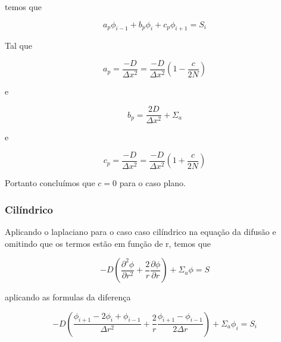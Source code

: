 \documentclass{article}
\begin{document}
                temos que
                
                \begin{equation}
                    a_p \phi_{i-1}    +    b_p \phi_i    +    c_p \phi_{i+1} = S_i
                \end{equation}
        
                Tal que
        
                \begin{equation}
                    a_p = \frac{-D}{\Delta x^2} = \frac{-D}{\Delta x^2} ( 1 - \frac{c}{2N}) 
                \end{equation}
                
                e
        
                \begin{equation}
                    b_p = \frac{2D}{\Delta x^2} + \Sigma_a
                \end{equation}

                e

                \begin{equation}
                    c_p = \frac{-D}{\Delta x^2} = \frac{-D}{\Delta x^2} ( 1 + \frac{c}{2N}) 
                \end{equation}
                
                Portanto concluímos que $c=0$ para o caso plano.
                
            \subsubsection{Cilíndrico}
    
                Aplicando o laplaciano para o caso caso cilíndrico na equação da difusão e omitindo que os termos estão em função de r, temos que
                
                \begin{equation}
                    -D ( \frac{\partial^2\phi}{\partial r^2}  + \frac{2}{r} \frac{\partial\phi}{\partial r} ) + \Sigma_a \phi = S
                \end{equation}
        
                aplicando as formulas da diferença
        
                \begin{equation}
                    -D ( \frac{\phi_{i+1} - 2\phi_i + \phi_{i-1}}{\Delta r^2}   +   \frac{2}{r}  \frac{ \phi_{i+1} - \phi_{i-1}}{ 2 \Delta r} ) + \Sigma_a \phi_i = S_i
                \end{equation}
    
\end{document}
